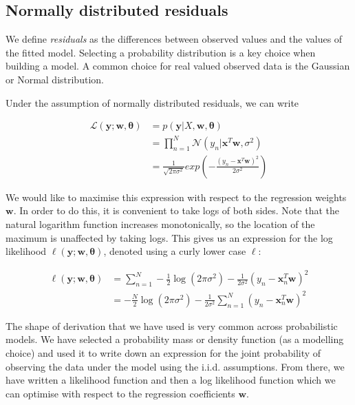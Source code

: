 \documentclass[11pt]{article}
\begin{document}
	\subsection{Normally distributed residuals}
	
	We define \emph{residuals} as the differences between observed values and the values of the fitted model. Selecting a probability distribution is a key choice when building a model. A common choice for real valued observed data is the Gaussian or Normal distribution.
	
	Under the assumption of normally distributed residuals, we can write
	
	\begin{align*}
		\mathcal{L}(\boldsymbol{y}; \boldsymbol{w}, \boldsymbol{\theta}) &= p(\boldsymbol{y} | X, \boldsymbol{w}, \boldsymbol{\theta}) \\
		&= \prod_{n=1}^{N} \mathcal{N}(y_{n} | \boldsymbol{x}^{T}\boldsymbol{w}, \sigma^{2}) \\
		&= \frac{1}{\sqrt{2\pi\sigma^{2}}}exp\left(-\frac{(y_{n} - \boldsymbol{x}^{T}\boldsymbol{w})^{2}}{2\sigma^{2}}\right)	
	\end{align*}
	
	We would like to maximise this expression with respect to the regression weights $\boldsymbol{w}$. In order to do this, it is convenient to take logs of both sides. Note that the natural logarithm function increases monotonically, so the location of the maximum is unaffected by taking logs. This gives us an expression for the log likelihood $\ell(\boldsymbol{y}; \boldsymbol{w}, \boldsymbol{\theta})$, denoted using a curly lower case $\ell$:
	
	\begin{align*}
		\ell(\boldsymbol{y}; \boldsymbol{w}, \boldsymbol{\theta}) &= \sum_{n=1}^{N} -\frac{1}{2}\log(2\pi\sigma^{2}) - \frac{1}{2\sigma^{2}}(y_{n} - \boldsymbol{x}_{n}^{T}\boldsymbol{w})^{2} \\
		&=  -\frac{N}{2}\log(2\pi\sigma^{2}) - \frac{1}{2\sigma^{2}} \sum_{n=1}^{N} (y_{n} - \boldsymbol{x}_{n}^{T}\boldsymbol{w})^{2}
	\end{align*}
	
	The shape of derivation that we have used is very common across probabilistic models. We have selected a probability mass or density function (as a modelling choice) and used it to write down an expression for the joint probability of observing the data under the model using the i.i.d. assumptions. From there, we have written a likelihood function and then a log likelihood function which we can optimise with respect to the regression coefficients $\boldsymbol{w}$.
	
\end{document}
